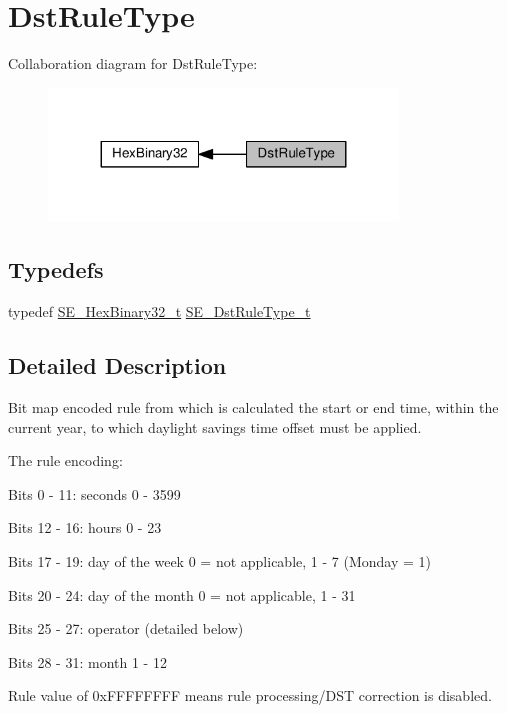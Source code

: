 \hypertarget{group__DstRuleType}{}\section{Dst\+Rule\+Type}
\label{group__DstRuleType}
Collaboration diagram for Dst\+Rule\+Type\+:\nopagebreak
\begin{figure}[H]
\begin{center}
\leavevmode
\includegraphics[width=263pt]{group__DstRuleType}
\end{center}
\end{figure}
\subsection*{Typedefs}
\begin{DoxyCompactItemize}
\item 
typedef \hyperlink{group__HexBinary32_ga062e99a233c4875284116657d048bb98}{S\+E\+\_\+\+Hex\+Binary32\+\_\+t} \hyperlink{group__DstRuleType_ga215f3da52e2c5be95bc85b60e8702bcf}{S\+E\+\_\+\+Dst\+Rule\+Type\+\_\+t}
\end{DoxyCompactItemize}


\subsection{Detailed Description}
Bit map encoded rule from which is calculated the start or end time, within the current year, to which daylight savings time offset must be applied.

The rule encoding\+:

Bits 0 -\/ 11\+: seconds 0 -\/ 3599

Bits 12 -\/ 16\+: hours 0 -\/ 23

Bits 17 -\/ 19\+: day of the week 0 = not applicable, 1 -\/ 7 (Monday = 1)

Bits 20 -\/ 24\+: day of the month 0 = not applicable, 1 -\/ 31

Bits 25 -\/ 27\+: operator (detailed below)

Bits 28 -\/ 31\+: month 1 -\/ 12

Rule value of 0x\+F\+F\+F\+F\+F\+F\+FF means rule processing/\+D\+ST correction is disabled.

